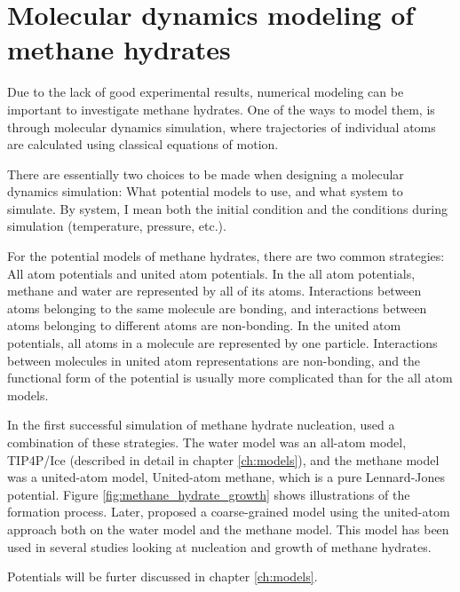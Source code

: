 \section{Molecular dynamics modeling of methane hydrates}
Due to the lack of good experimental results, numerical modeling can be important to investigate methane hydrates. One of the ways to model them, is through molecular dynamics simulation, where trajectories of individual atoms are calculated using classical equations of motion. 

There are essentially two choices to be made when designing a molecular dynamics simulation: What potential models to use, and what system to simulate. By system, I mean both the initial condition and the conditions during simulation (temperature, pressure, etc.).

For the potential models of methane hydrates, there are two common strategies: All atom potentials and united atom potentials. In the all atom potentials, methane and water are represented by all of its atoms. Interactions between atoms belonging to the same molecule are bonding, and interactions between atoms belonging to different atoms are non-bonding. In the united atom potentials, all atoms in a molecule are represented by one particle. Interactions between molecules in united atom representations are non-bonding, and the functional form of the potential is usually more complicated than for the all atom models. 

In the first successful simulation of methane hydrate nucleation, \citet{Walsh2009} used a combination of these strategies. The water model was an all-atom model, TIP4P/Ice (described in detail in chapter \ref{ch:models}), and the methane model was a united-atom model, United-atom methane, which is a pure Lennard-Jones potential. Figure \ref{fig:methane_hydrate_growth} shows illustrations of the formation process.  Later, \citet{Jacobson2010b} proposed a coarse-grained model using the united-atom approach both on the water model and the methane model. This model has been used in several studies looking at nucleation and growth of methane hydrates. 

Potentials will be furter discussed in chapter \ref{ch:models}.

